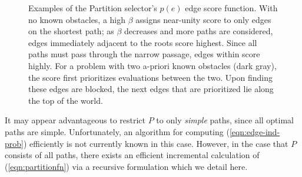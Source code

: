 \documentclass[nobib]{tufte-book}
\begin{document}
\begin{figure}
   \centering
   
   

   \caption{Examples of the Partition selector's
      $p(e)$ edge score function.
      With no known obstacles,
      a high $\beta$ assigns near-unity score to only edges on the
      shortest path;
      as $\beta$ decreases and more paths are considered,
      edges immediately adjacent to the roots score highest.
      Since all paths must pass
      through the narrow passage,
      edges within score highly.
      For a problem with two a-priori known obstacles (dark gray),
      the score first prioritizes evaluations between the two.
      Upon finding these edges are blocked,
      the next edges that are prioritized lie along the top of the world.}
   \label{ref:example-scores}
\end{figure}

It may appear advantageous to restrict $P$ to only
\emph{simple} paths,
since all optimal paths are simple.
Unfortunately,
an algorithm for computing (\ref{eqn:edge-ind-prob}) efficiently is not
currently known in this case.
However,
in the case that $P$ consists of all paths,
there exists an efficient incremental calculation of
(\ref{eqn:partitionfn}) via a recursive formulation
which we detail here.
\end{document}
